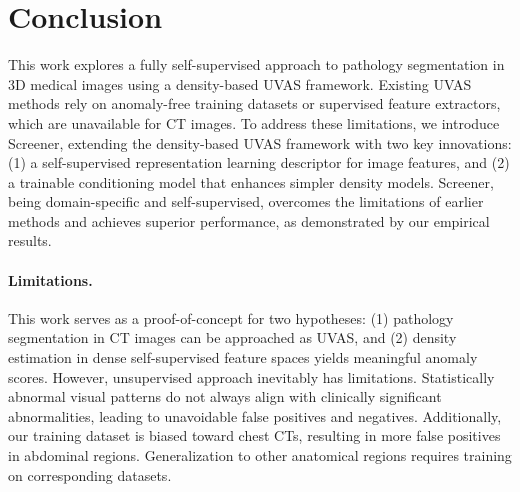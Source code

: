 
\section{Conclusion}
\label{sec:conclusion}
This work explores a fully self-supervised approach to pathology segmentation in 3D medical images using a density-based UVAS framework. Existing UVAS methods rely on anomaly-free training datasets or supervised feature extractors, which are unavailable for CT images. To address these limitations, we introduce Screener, extending the density-based UVAS framework with two key innovations: (1) a self-supervised representation learning descriptor for image features, and (2) a trainable conditioning model that enhances simpler density models. Screener, being domain-specific and self-supervised, overcomes the limitations of earlier methods and achieves superior performance, as demonstrated by our empirical results.

\paragraph{Limitations.}
This work serves as a proof-of-concept for two hypotheses: (1) pathology segmentation in CT images can be approached as UVAS, and (2) density estimation in dense self-supervised feature spaces yields meaningful anomaly scores. However, unsupervised approach inevitably has limitations. Statistically abnormal visual patterns do not always align with clinically significant abnormalities, leading to unavoidable false positives and negatives. Additionally, our training dataset is biased toward chest CTs, resulting in more false positives in abdominal regions. Generalization to other anatomical regions requires training on corresponding datasets.


